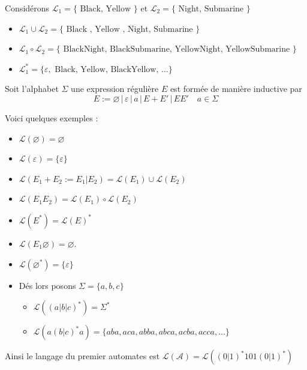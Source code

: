 \begin{exemple}
    Considérons $\mathcal{L}_1= \{\text{ Black, Yellow } \}$ et $\mathcal{L}_2= \{\text{ Night, Submarine }\}$
    \begin{itemize}
        \item $\mathcal{L}_1 \cup \mathcal{L}_2 = \{\text{ Black , Yellow , Night, Submarine }\}$
        \item $\mathcal{L}_1 \circ \mathcal{L}_2 = \{ \text{ BlackNight, BlackSubmarine, YellowNight, YellowSubmarine }\}$
        \item $ \mathcal{L}_1^*  =\{ \varepsilon, \text{ Black, Yellow, BlackYellow, ...} \} $
    \end{itemize}
\end{exemple}

Soit l'alphabet $\Sigma$ une expression régulière $E$ est formée de manière inductive par
$$E := \varnothing \, | \,\varepsilon \, | \, a \, | \, E+E' \, | \, EE' \quad  a \in \Sigma $$ 


\begin{exemple}
    Voici quelques exemples :
    \begin{itemize}
        \item $\mathcal{L}(\varnothing)= \varnothing$
        \item $\mathcal{L}(\varepsilon)= \{\varepsilon\}$
        \item $\mathcal{L}(E_1 +E_2 := E_1|E_2) = \mathcal{L}(E_1)\cup \mathcal{L}(E_2)$
        \item $\mathcal{L}(E_1E_2)= \mathcal{L}(E_1) \circ \mathcal{L}(E_2)$
        \item $\mathcal{L}(E^*)= \mathcal{L}(E)^*$
        \item $\mathcal{L}(E_1 \varnothing) = \varnothing$. 
        \item $\mathcal{L}(\varnothing^*)= \{\varepsilon\}$
        \item  Dés lors posons $\Sigma= \{a,b,c\}$
            \begin{itemize}
                \item $\mathcal{L}((a|b|c)^*)= \Sigma^*$
                \item $\mathcal{L}(a(b|c)^*a)= \{aba, aca ,abba , abca , acba, acca, \dots \}$
                \end{itemize}
    \end{itemize}

\end{exemple}

\begin{remarque}
    Ainsi le langage du premier automates est $\mathcal{L}(\mathcal{A})= \mathcal{L}((0|1)^* 101 (0|1)^*)$
\end{remarque}

